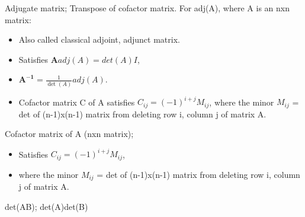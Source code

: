 


Adjugate matrix; Transpose of cofactor matrix. For adj(A), where A is an nxn matrix: \begin{itemize} \item Also called classical adjoint, adjunct matrix.  \item Satisfies $\mathbf{A}adj(A)=det(A)I$, \item $\mathbf{A^{-1}}=\frac{1}{\det(A)}adj(A)$.  \item Cofactor matrix C of A satisfies $C_{ij}=(-1)^{i+j}M_{ij}$, where the minor $M_{ij}$ = det of (n-1)x(n-1) matrix from deleting row i, column j of matrix A.  \end{itemize}

Cofactor matrix of A (nxn matrix); \begin{itemize} \item Satisfies $C_{ij}=(-1)^{i+j}M_{ij}$, \item where the minor $M_{ij}$ = det of (n-1)x(n-1) matrix from deleting row i, column j of matrix A.  \end{itemize}

det(AB); det(A)det(B)


